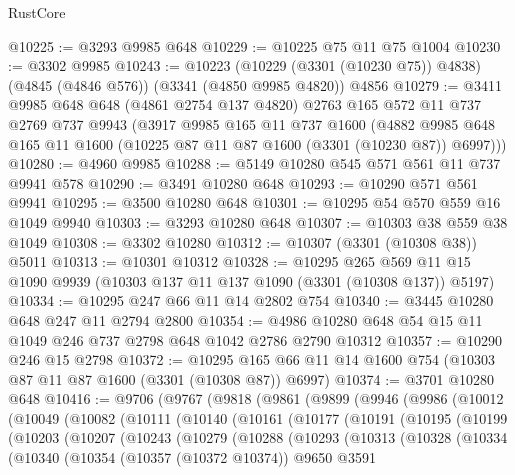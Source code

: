 \begin{lexlean}{RustCore}
\begin{coremodule}
@10225 := @3293 @9985 @648
@10229 := @10225 @75 @11 @75 @1004
@10230 := @3302 @9985
@10243 := @10223
    (@10229 (@3301 (@10230 @75)) @4838)
    (@4845 (@4846 @576))
    (@3341 (@4850 @9985 @4820))
    @4856
@10279 := @3411
    @9985
    @648
    @648
    (@4861 @2754 @137 @4820)
    @2763
    @165
    @572
    @11
    @737
    @2769
    @737
    @9943
    (@3917
      @9985
      @165
      @11
      @737
      @1600
      (@4882 @9985 @648 @165 @11 @1600 (@10225 @87 @11 @87 @1600 (@3301 (@10230 @87)) @6997)))
@10280 := @4960 @9985
@10288 := @5149 @10280 @545 @571 @561 @11 @737 @9941 @578
@10290 := @3491 @10280 @648
@10293 := @10290 @571 @561 @9941
@10295 := @3500 @10280 @648
@10301 := @10295 @54 @570 @559 @16 @1049 @9940
@10303 := @3293 @10280 @648
@10307 := @10303 @38 @559 @38 @1049
@10308 := @3302 @10280
@10312 := @10307 (@3301 (@10308 @38)) @5011
@10313 := @10301 @10312
@10328 := @10295
    @265
    @569
    @11
    @15
    @1090
    @9939
    (@10303 @137 @11 @137 @1090 (@3301 (@10308 @137)) @5197)
@10334 := @10295 @247 @66 @11 @14 @2802 @754
@10340 := @3445 @10280 @648 @247 @11 @2794 @2800
@10354 := @4986 @10280 @648 @54 @15 @11 @1049 @246 @737 @2798 @648 @1042 @2786 @2790 @10312
@10357 := @10290 @246 @15 @2798
@10372 := @10295 @165 @66 @11 @14 @1600 @754 (@10303 @87 @11 @87 @1600 (@3301 (@10308 @87)) @6997)
@10374 := @3701 @10280 @648
@10416 := @9706
    (@9767
      (@9818
        (@9861
          (@9899
            (@9946
              (@9986
                (@10012
                  (@10049
                    (@10082
                      (@10111
                        (@10140
                          (@10161
                            (@10177
                              (@10191
                                (@10195
                                  (@10199
                                    (@10203
                                      (@10207
                                        (@10243
                                          (@10279
                                            (@10288
                                              (@10293
                                                (@10313
                                                  (@10328
                                                    (@10334
                                                      (@10340
                                                        (@10354
                                                          (@10357 (@10372 @10374))
                                                          @9650
                                                          @3591

\end{coremodule}
\end{lexlean}
